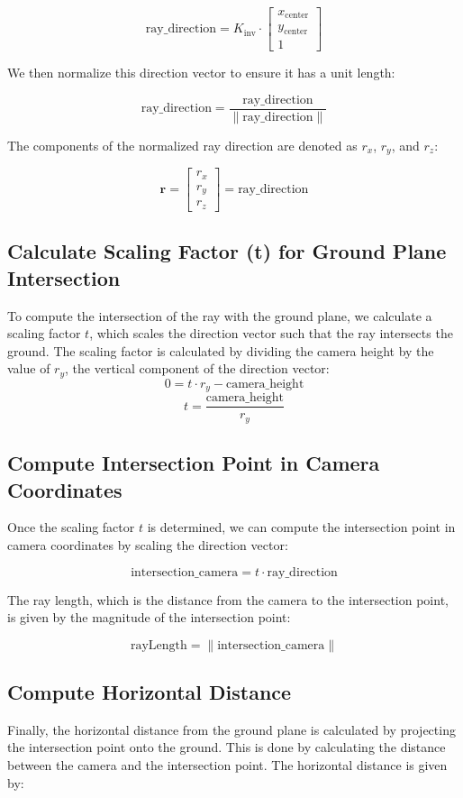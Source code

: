\documentclass[a4paper,twocolumn]{article}
\begin{document}
\[
\text{ray\_direction} = K_{\text{inv}} \cdot \begin{bmatrix} x_{\text{center}} \\ y_{\text{center}} \\ 1 \end{bmatrix}
\]

We then normalize this direction vector to ensure it has a unit length:

\[
\text{ray\_direction} = \frac{\text{ray\_direction}}{\|\text{ray\_direction}\|}
\]

The components of the normalized ray direction are denoted as \(r_x\), \(r_y\), and \(r_z\):

\[
\mathbf{r} = \begin{bmatrix} r_x \\ r_y \\ r_z \end{bmatrix} = \text{ray\_direction}
\]


\subsection{Calculate Scaling Factor (t) for Ground Plane Intersection}
To compute the intersection of the ray with the ground plane, we calculate a scaling factor \(t\), which scales the direction vector such that the ray intersects the ground. The scaling factor is calculated by dividing the camera height by the value of \(r_y\), the vertical component of the direction vector:
\[
0 = t\cdot{r_y} - \text{camera\_height}
\]
\[
t = \frac{\text{camera\_height}}{r_y}
\]

\subsection{Compute Intersection Point in Camera Coordinates}
Once the scaling factor \(t\) is determined, we can compute the intersection point in camera coordinates by scaling the direction vector:

\[
\text{intersection\_camera} = t \cdot \text{ray\_direction}
\]


The ray length, which is the distance from the camera to the intersection point, is given by the magnitude of the intersection point:

\[
\text{rayLength} = \|\text{intersection\_camera}\|
\]

\subsection{Compute Horizontal Distance}
Finally, the horizontal distance from the ground plane is calculated by projecting the intersection point onto the ground. This is done by calculating the distance between the camera and the intersection point. The horizontal distance is given by:
\end{document}
